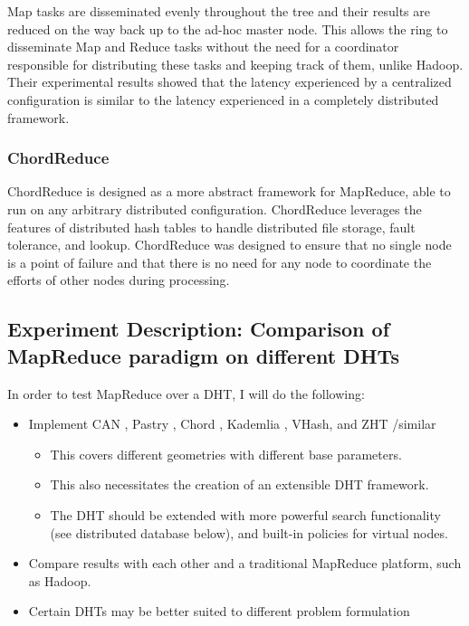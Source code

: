 \documentclass[10pt,letterpaper,twoside]{report}
\begin{document}
Map tasks are disseminated evenly throughout the tree and their results are reduced on the way back up to the ad-hoc master node.  
This allows the ring to disseminate Map and Reduce tasks without the need for a coordinator responsible for distributing these tasks and keeping track of them, unlike Hadoop.  
Their experimental results showed that the latency experienced by a centralized configuration is similar to the latency experienced in a completely distributed framework.





\subsubsection{ChordReduce}
ChordReduce is designed as a more abstract framework for MapReduce, able to run on any arbitrary distributed configuration.
ChordReduce leverages the features of distributed hash tables to handle distributed file storage, fault tolerance, and lookup.  
ChordReduce  was designed to ensure that no single node is a point of failure and that there is no need for any node to coordinate the efforts of other nodes during processing.  



\subsection{Experiment Description: Comparison of MapReduce paradigm on different DHTs}
In order to test MapReduce over a DHT, I will do the following:
\begin{itemize}
	\item Implement CAN \cite{can}, Pastry \cite{pastry}, Chord \cite{chord}, Kademlia \cite{kademlia}, VHash, and ZHT \cite{li2013zht} /similar
	\begin{itemize}	
		\item This covers different geometries with different base parameters.
		\item This also necessitates the creation of an extensible DHT framework.
		\item  The DHT should be extended with more powerful search functionality (see distributed database below), and built-in policies for virtual nodes.
		
	\end{itemize}
	\item Compare results with each other and a traditional MapReduce platform, such as Hadoop.
	\item Certain DHTs may be better suited to different problem formulation
	
\end{itemize}
\end{document}
